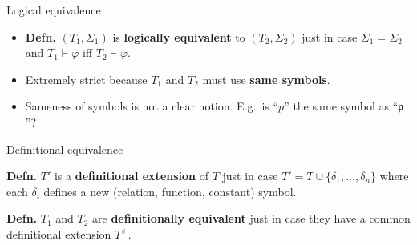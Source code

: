 \documentclass[fleqn]{beamer}
\begin{document}
\begin{frame}{Logical equivalence}

  \begin{itemize}
  \item \textbf{Defn.} $(T_1,\Sigma _1)$ is \textbf{logically
      equivalent} to $(T_2,\Sigma _2)$ just in case
    $\Sigma _1=\Sigma _2$ and $T_1\vdash\varphi$ iff
    $T_2\vdash\varphi$.
  \item Extremely strict because $T_1$ and $T_2$ must use \textbf{same
      symbols}.
  \item Sameness of symbols is not a clear notion. E.g.\ is ``$p$''
    the same symbol as ``$\mathfrak{p}$''?
  \end{itemize}



\end{frame}

\begin{frame}{Definitional equivalence}

  \textbf{Defn.} $T'$ is a \textbf{definitional extension} of $T$ just
  in case $T'=T\cup \{ \delta _1,\dots ,\delta _n\}$ where each
  $\delta _i$ defines a new (relation, function, constant) symbol.

  \bigskip \textbf{Defn.} $T_1$ and $T_2$ are \textbf{definitionally
    equivalent} just in case they have a common definitional extension
  $T^+$.


\end{frame}
\end{document}
